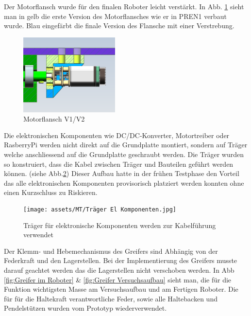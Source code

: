 Der Motorflansch wurde für den finalen Roboter leicht verstärkt. In  Abb. \ref{fig: Motorflansch V1/V2} sieht man in gelb die erste Version des Motorflansches wie er in PREN1 verbaut wurde. Blau eingefärbt die finale Version des Flansche mit einer Verstrebung. 

\begin{figure}[H]
\centering
\includegraphics[width=5cm]{assets/MT/Motorflansch Vergleich.png}
\caption{Motorflansch V1/V2}
\label{fig: Motorflansch V1/V2}
\end{figure}

Die elektronischen Komponenten wie DC/DC-Konverter, Motortreiber oder RasberryPi werden nicht direkt auf die Grundplatte montiert, sondern auf Träger welche anschliessend auf die Grundplatte geschraubt werden. Die Träger wurden so konstruiert, dass die Kabel zwischen Träger und Bauteilen geführt werden können. (siehe Abb.\ref{fig: Träger für elektronische Komponenten}) Dieser Aufbau hatte in der frühen Testphase den Vorteil das alle elektronischen Komponenten provisorisch platziert werden konnten ohne einen Kurzschluss zu Riskieren. 

\begin{figure}[H]
\centering
\texttt{[image: assets/MT/Träger El Komponenten.jpg]}
\caption{Träger für elektronische Komponenten werden zur Kabelführung verwendet}
\label{fig: Träger für elektronische Komponenten}
\end{figure}


Der Klemm- und Hebemechanismus des Greifers sind Abhängig von der Federkraft und den Lagerstellen. Bei der Implementierung des Greifers musste darauf geachtet werden das die Lagerstellen nicht verschoben werden. In Abb \ref{fig:Greifer im Roboter} \& \ref{fig:Greifer Versuchsaufbau} sieht man, die für die Funktion wichtigsten Masse am Versuchsaufbau und am Fertigen Roboter. Die für für die Haltekraft verantwortliche Feder, sowie alle Haltebacken und Pendelstützen wurden vom Prototyp wiederverwendet. 

